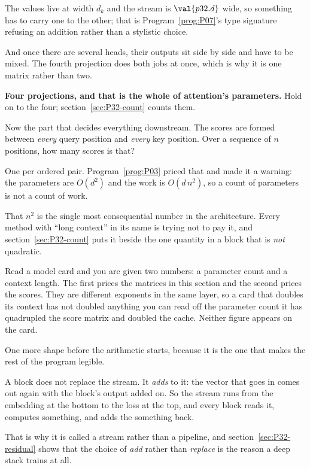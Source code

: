 \begin{fr}

The values live at width $d_k$ and the stream is $\val{p32.d}$ wide, so
something has to carry one to the other; that is Program~\ref{prog:P07}'s
type signature refusing an addition rather than a stylistic choice.

And once there are several heads, their outputs sit side by side and have to
be mixed. The fourth projection does both jobs at once, which is why it is
one matrix rather than two.

\textbf{Four projections, and that is the whole of attention's parameters.}
Hold on to the four; section~\ref{sec:P32-count} counts them.

Now the part that decides everything downstream. The scores are formed
between \emph{every} query position and \emph{every} key position. Over a
sequence of $n$ positions, how many scores is that?
\dotline
\nextframe
\end{fr}

\begin{fr}

One per ordered pair. Program~\ref{prog:P03} priced that and made it a
warning: the parameters are $O(d^{2})$ and the work is $O(d\,n^{2})$, so a
count of parameters is not a count of work.

That $n^{2}$ is the single most consequential number in the architecture.
Every method with \enquote{long context} in its name is trying not to pay
it, and section~\ref{sec:P32-count} puts it beside the one quantity in a
block that is \emph{not} quadratic.

\begin{aibox}
Read a model card and you are given two numbers: a parameter count and a
context length. The first prices the matrices in this section and the second
prices the scores. They are different exponents in the same layer, so a card
that doubles its context has not doubled anything you can read off the
parameter count \dash{} it has quadrupled the score matrix and doubled the
cache. Neither figure appears on the card.
\end{aibox}
\end{fr}


\begin{fr}
One more shape before the arithmetic starts, because it is the one that
makes the rest of the program legible.

A block does not replace the stream. It \emph{adds} to it: the vector that
goes in comes out again with the block's output added on. So the stream runs
from the embedding at the bottom to the loss at the top, and every block
reads it, computes something, and adds the something back.

That is why it is called a stream rather than a pipeline, and
section~\ref{sec:P32-residual} shows that the choice of \emph{add} rather
than \emph{replace} is the reason a deep stack trains at all.
\end{fr}

